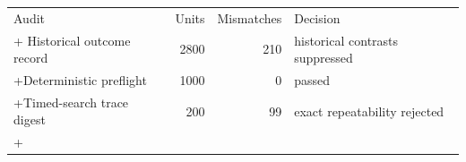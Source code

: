 \begin{tabular}{lrrl}
\toprule
Audit & Units & Mismatches & Decision \\
+\midrule
Historical outcome record & 2800 & 210 & historical contrasts suppressed \\
+Deterministic preflight & 1000 & 0 & passed \\
+Timed-search trace digest & 200 & 99 & exact repeatability rejected \\
+\bottomrule
\end{tabular}
